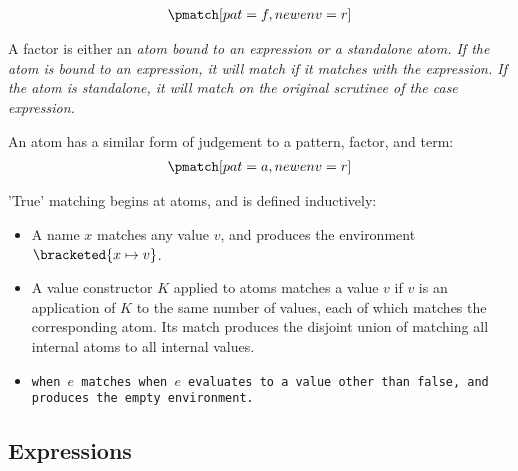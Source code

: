 \documentclass[]{article}
\begin{document}
    \begin{align*}
        \pmatch[pat=f, newenv=r]
    \end{align*}

    A factor is either an \it{atom} bound to an \it{expression} or a standalone
    \it{atom}. If the atom is bound to an expression, it will match if it
    matches with the expression. If the atom is standalone, it will match on the
    \it{original} scrutinee of the case expression.

    An atom has a similar form of judgement to a pattern, factor, and term:
    \begin{align*}
        \pmatch[pat=a, newenv=r]
    \end{align*}

    'True' matching begins at atoms, and is defined inductively: 
    \begin{itemize}
        \item A name $x$ matches any value $v$, and produces the environment 
        $\bracketed{x \mapsto v}$. 
        \item A value constructor $K$ applied to atoms  matches 
        a value $v$ if $v$ is an application of $K$ to the same number of values,
        each of which matches the corresponding atom. Its match produces 
        the disjoint union of matching all internal atoms to all internal values. 
        \item \tt{when} $e$ matches when $e$ evaluates to a value other than 
        \tt{false}, and produces the empty environment. 
    \end{itemize}






    \subsection{Expressions}
    
\end{document}
